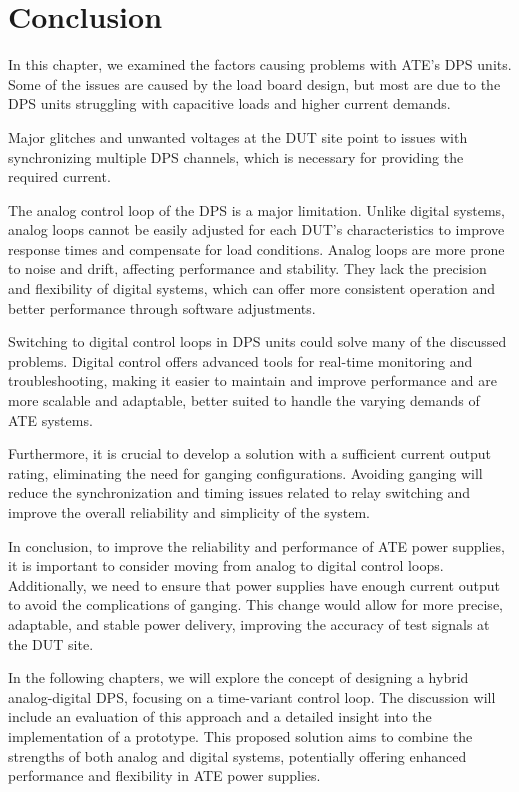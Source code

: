 \section{Conclusion}
\label{sec:diagnostics-conclusion}

In this chapter, we examined the factors causing problems with \ac{ATE}'s
\ac{DPS} units.
Some of the issues are caused by the load board design, but most are due to the
\ac{DPS} units struggling with capacitive loads and higher current demands.

Major glitches and unwanted voltages at the DUT site point to issues with
synchronizing multiple DPS channels, which is necessary for providing the
required current.

The analog control loop of the DPS is a major limitation.
Unlike digital systems, analog loops cannot be easily adjusted for each
\ac{DUT}'s characteristics to improve response times and compensate for load
conditions.
Analog loops are more prone to noise and drift, affecting performance and
stability.
They lack the precision and flexibility of digital systems, which can offer
more consistent operation and better performance through software adjustments.

Switching to digital control loops in DPS units could solve many of the
discussed problems.
Digital control offers advanced tools for real-time monitoring and
troubleshooting, making it easier to maintain and improve performance and are
more scalable and adaptable, better suited to handle the varying demands
of \ac{ATE} systems.

Furthermore, it is crucial to develop a solution with a sufficient current
output rating, eliminating the need for ganging configurations.
Avoiding ganging will reduce the synchronization and timing issues
related to relay switching and improve the overall reliability and simplicity
of the system.

In conclusion, to improve the reliability and performance of \ac{ATE} power
supplies, it is important to consider moving from analog to digital control
loops.
Additionally, we need to ensure that power supplies have enough current
output to avoid the complications of ganging.
This change would allow for more precise, adaptable, and stable power delivery,
improving the accuracy of test signals at the \ac{DUT} site.

In the following chapters, we will explore the concept of designing a hybrid
analog-digital \ac{DPS}, focusing on a time-variant control loop.
The discussion will include an evaluation of this approach and a detailed
insight into the implementation of a prototype.
This proposed solution aims to combine the strengths of both analog and
digital systems, potentially offering enhanced performance and
flexibility in \ac{ATE} power supplies.
